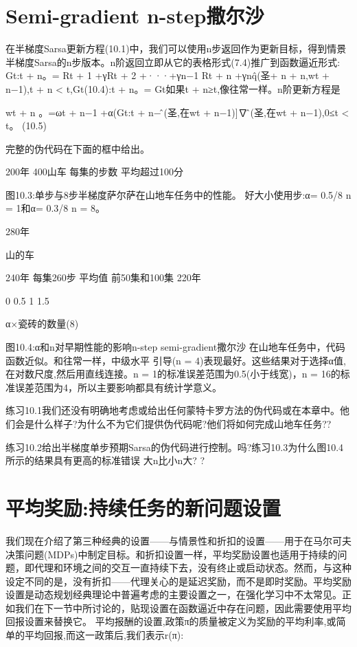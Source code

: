 \section{Semi-gradient n-step撒尔沙}

在半梯度Sarsa更新方程(10.1)中，我们可以使用n步返回作为更新目标，得到情景半梯度Sarsa的n步版本。n阶返回立即从它的表格形式(7.4)推广到函数逼近形式:
Gt:t + n。= Rt + 1 +γRt + 2 +···+γn−1 Rt + n +γnq̂(圣+ n + n,wt + n−1),t + n < t,Gt(10.4):t + n。= Gt如果t + n≥t,像往常一样。n阶更新方程是

wt + n
。=ωt + n−1 +α(Gt:t + n−问̂(圣,在wt + n−1)]∇问̂(圣,在wt + n−1),0≤t < t。
(10.5)

完整的伪代码在下面的框中给出。
 
200年
400山车
每集的步数
平均超过100分
 

图10.3:单步与8步半梯度萨尔萨在山地车任务中的性能。
好大小使用步:α= 0.5/8 n = 1和α= 0.3/8 n = 8。
 
280年

山的车


240年
每集260步
平均值
前50集和100集
220年

0 0.5
1 1.5

α×瓷砖的数量(8)

图10.4:α和n对早期性能的影响n-step semi-gradient撒尔沙
在山地车任务中，代码函数近似。和往常一样，中级水平
引导(n = 4)表现最好。这些结果对于选择α值,在对数尺度,然后用直线连接。n = 1的标准误差范围为0.5(小于线宽)，n = 16的标准误差范围为4，所以主要影响都具有统计学意义。

练习10.1我们还没有明确地考虑或给出任何蒙特卡罗方法的伪代码或在本章中。他们会是什么样子?为什么不为它们提供伪代码呢?他们将如何完成山地车任务??

练习10.2给出半梯度单步预期Sarsa的伪代码进行控制。吗?练习10.3为什么图10.4所示的结果具有更高的标准错误
大n比小n大? 					?

\section{平均奖励:持续任务的新问题设置}

我们现在介绍了第三种经典的设置——与情景性和折扣的设置——用于在马尔可夫决策问题(MDPs)中制定目标。和折扣设置一样，平均奖励设置也适用于持续的问题，即代理和环境之间的交互一直持续下去，没有终止或启动状态。然而，与这种设定不同的是，没有折扣——代理关心的是延迟奖励，而不是即时奖励。平均奖励设置是动态规划经典理论中普遍考虑的主要设置之一，在强化学习中不太常见。正如我们在下一节中所讨论的，贴现设置在函数逼近中存在问题，因此需要使用平均回报设置来替换它。
平均报酬的设置,政策π的质量被定义为奖励的平均利率,或简单的平均回报,而这一政策后,我们表示r(π):
 
